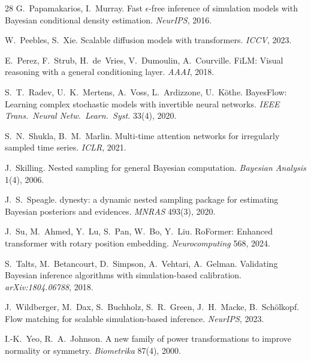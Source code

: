 \documentclass[10pt]{article}
\begin{document}
\begin{thebibliography}{28}
 G.~Papamakarios, I.~Murray.
Fast $\epsilon$-free inference of simulation models with Bayesian conditional density estimation.
\emph{NeurIPS}, 2016.


 W.~Peebles, S.~Xie.
Scalable diffusion models with transformers. \emph{ICCV}, 2023.

 E.~Perez, F.~Strub, H.~de~Vries, V.~Dumoulin, A.~Courville.
FiLM: Visual reasoning with a general conditioning layer. \emph{AAAI}, 2018.

 S.~T.~Radev, U.~K.~Mertens, A.~Voss, L.~Ardizzone, U.~K\"othe.
BayesFlow: Learning complex stochastic models with invertible neural networks.
\emph{IEEE Trans.\ Neural Netw.\ Learn.\ Syst.} 33(4), 2020.

 S.~N.~Shukla, B.~M.~Marlin.
Multi-time attention networks for irregularly sampled time series. \emph{ICLR}, 2021.

 J.~Skilling. Nested sampling for general Bayesian
computation. \emph{Bayesian Analysis} 1(4), 2006.

 J.~S.~Speagle. dynesty: a dynamic nested sampling package
for estimating Bayesian posteriors and evidences. \emph{MNRAS} 493(3), 2020.

 J.~Su, M.~Ahmed, Y.~Lu, S.~Pan, W.~Bo, Y.~Liu.
RoFormer: Enhanced transformer with rotary position embedding. \emph{Neurocomputing} 568, 2024.

 S.~Talts, M.~Betancourt, D.~Simpson, A.~Vehtari, A.~Gelman.
Validating Bayesian inference algorithms with simulation-based calibration. \emph{arXiv:1804.06788},
2018.

 J.~Wildberger, M.~Dax, S.~Buchholz, S.~R.~Green,
J.~H.~Macke, B.~Sch\"olkopf. Flow matching for scalable simulation-based inference. \emph{NeurIPS},
2023.

 I.-K.~Yeo, R.~A.~Johnson.
A new family of power transformations to improve normality or symmetry. \emph{Biometrika} 87(4), 2000.

\end{thebibliography}
\end{document}
